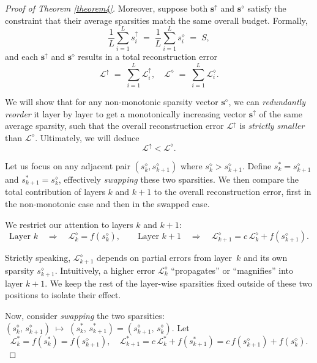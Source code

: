 \begin{proof}[Proof of Theorem \ref{theorem4}]
Moreover, suppose both $\mathbf{s}^\uparrow$ and $\mathbf{s}^\diamond$ satisfy the constraint that their average sparsities match the same overall budget. Formally,
\begin{equation}
  \frac{1}{L} \sum_{i=1}^L s_i^\uparrow \;=\; \frac{1}{L} \sum_{i=1}^L s_i^\diamond \;=\; S,
\end{equation}
and each $\mathbf{s}^\uparrow$ and $\mathbf{s}^\diamond$ results in a total reconstruction error
\begin{equation}
  \mathcal{L}^\uparrow \;=\; \sum_{i=1}^{L} \mathcal{L}_i^\uparrow, 
  \quad
  \mathcal{L}^\diamond \;=\; \sum_{i=1}^{L} \mathcal{L}_i^\diamond.
\end{equation}

We will show that for any non-monotonic sparsity vector $\mathbf{s}^\diamond$, we can \textit{redundantly reorder} it layer by layer to get a monotonically increasing vector $\mathbf{s}^\uparrow$ of the same average sparsity, such that the overall reconstruction error $\mathcal{L}^\uparrow$ is \textit{strictly smaller} than $\mathcal{L}^\diamond$. 
Ultimately, we will deduce
\begin{equation}
  \mathcal{L}^\uparrow < \mathcal{L}^\diamond.
\end{equation}

Let us focus on any adjacent pair $(s_k^\diamond, s_{k+1}^\diamond)$ where $s_k^\diamond > s_{k+1}^\diamond$. Define $s_k^\ast = s_{k+1}^\diamond$ and $s_{k+1}^\ast = s_k^\diamond$, effectively \textit{swapping} these two sparsities. We then compare the total contribution of layers $k$ and $k+1$ to the overall reconstruction error, first in the non-monotonic case and then in the swapped case.

We restrict our attention to layers $k$ and $k+1$:
\begin{equation}
  \text{Layer } k \quad\Rightarrow\quad 
  \mathcal{L}_k^\diamond = f(s_k^\diamond),
  \qquad
  \text{Layer } k+1 \quad\Rightarrow\quad
  \mathcal{L}_{k+1}^\diamond = c \, \mathcal{L}_k^\diamond + f(s_{k+1}^\diamond).
\end{equation}

Strictly speaking, $\mathcal{L}_{k+1}^\diamond$ depends on partial errors from layer~$k$ and its own sparsity $s_{k+1}^\diamond$. Intuitively, a higher error $\mathcal{L}_k^\diamond$ “propagates” or “magnifies” into layer $k+1$. We keep the rest of the layer-wise sparsities fixed outside of these two positions to isolate their effect.

Now, consider \emph{swapping} the two sparsities: $(s_k^\diamond,\, s_{k+1}^\diamond) \;\mapsto\; (s_k^\ast,\, s_{k+1}^\ast) = (s_{k+1}^\diamond,\, s_k^\diamond)$. Let
\begin{equation}
  \mathcal{L}_k^\ast = f(s_k^\ast) = f(s_{k+1}^\diamond),
  \quad
  \mathcal{L}_{k+1}^\ast = c \, \mathcal{L}_k^\ast + f(s_{k+1}^\ast) = c\,f(s_{k+1}^\diamond) + f(s_k^\diamond).
\end{equation}


\end{proof}
